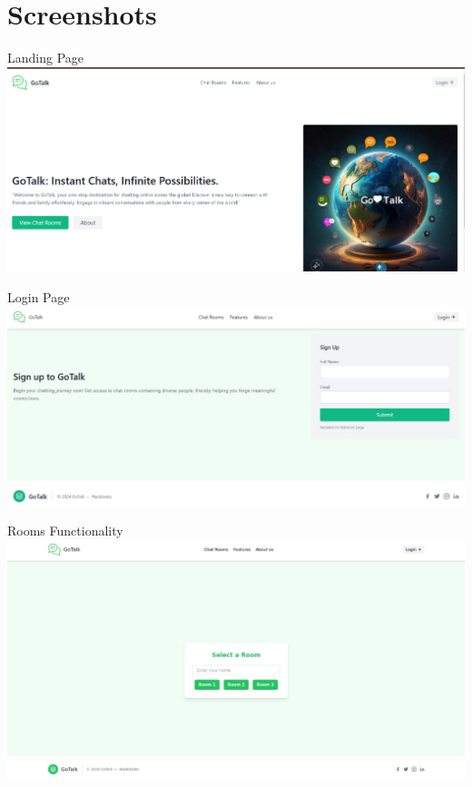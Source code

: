 \documentclass{beamer}
\begin{document}
\section{Screenshots}
\begin{frame}{Landing Page}
            \centering
            \includegraphics[width=0.9 \textwidth]{Pictures/landingpage.png}
\end{frame}

\begin{frame}{Login Page}
    \centering
    \includegraphics[width=0.9 \textwidth]{Pictures/login.jpg}
\end{frame}

\begin{frame}{Rooms Functionality}
            \centering
            \includegraphics[width=0.9 \textwidth]{Pictures/roomselection.jpg}
\end{frame}
\end{document}
